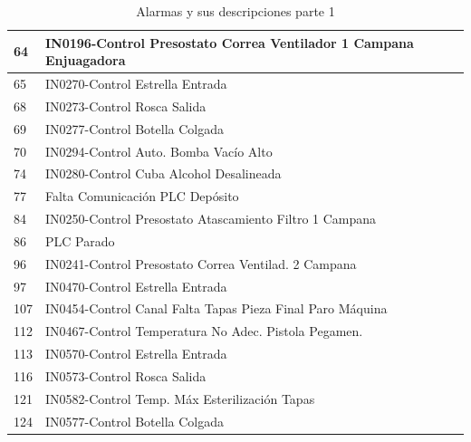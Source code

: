 \documentclass[10pt]{article}
\begin{document}
\begin{table}[!ht]
\begin{tabular}{|l|l|}
        64 & IN0196-Control Presostato Correa Ventilador 1 Campana Enjuagadora \\ \hline
        65 & IN0270-Control Estrella Entrada \\ \hline
        68 & IN0273-Control Rosca Salida \\ \hline
        69 & IN0277-Control Botella Colgada \\ \hline
        70 & IN0294-Control Auto. Bomba Vacío Alto \\ \hline
        74 & IN0280-Control Cuba Alcohol Desalineada \\ \hline
        77 & Falta Comunicación PLC Depósito \\ \hline
        84 & IN0250-Control Presostato Atascamiento Filtro 1 Campana \\ \hline
        86 & PLC Parado \\ \hline
        96 & IN0241-Control Presostato Correa Ventilad. 2 Campana \\ \hline
        97 & IN0470-Control Estrella Entrada \\ \hline
        107 & IN0454-Control Canal Falta Tapas Pieza Final Paro Máquina \\ \hline
        112 & IN0467-Control Temperatura No Adec.  Pistola Pegamen. \\ \hline
        113 & IN0570-Control Estrella Entrada \\ \hline
        116 & IN0573-Control Rosca Salida \\ \hline
        121 & IN0582-Control Temp. Máx Esterilización Tapas \\ \hline
        124 & IN0577-Control Botella Colgada \\ \hline
        
    \end{tabular}
    \caption{Alarmas y sus descripciones parte 1}
\end{table}
\end{document}
